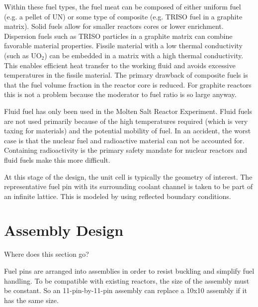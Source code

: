 Within these fuel types, the fuel meat can be composed of either uniform fuel (e.g. a pellet of UN) or some type of composite (e.g. TRISO fuel in a graphite matrix).
Solid fuels allow for smaller reactors cores or lower enrichment.
Dispersion fuels such as TRISO particles in a graphite matrix can combine favorable material properties. Fissile material with a low thermal conductivity (such as UO$_2$) can be embedded in a matrix with a high thermal conductivity. 
This enables efficient heat transfer to the working fluid and avoids excessive temperatures in the fissile material.
The primary drawback of composite fuels is that the fuel volume fraction in the reactor core is reduced. For graphite reactors this is not a problem because the moderator to fuel ratio is so large anyway.


Fluid fuel has only been used in the Molten Salt Reactor Experiment. 
Fluid fuels are not used primarily because of the high temperatures required (which is very taxing for materials) and the potential mobility of fuel.
In an accident, the worst case is that the nuclear fuel and radioactive material can not be accounted for. Containing radioactivity is the primary safety mandate for nuclear reactors and fluid fuels make this more difficult.

At this stage of the design, the unit cell is typically the geometry of interest. 
The representative fuel pin with its surrounding coolant channel is taken to be part of an infinite lattice. This is modeled by using reflected boundary conditions.


\section{Assembly Design}
Where does this section go?

Fuel pins are arranged into assemblies in order to resist buckling and simplify fuel handling.
To be compatible with existing reactors, the size of the assembly must be constant.
So an 11-pin-by-11-pin assembly can replace a 10x10 assembly if it has the same size.

